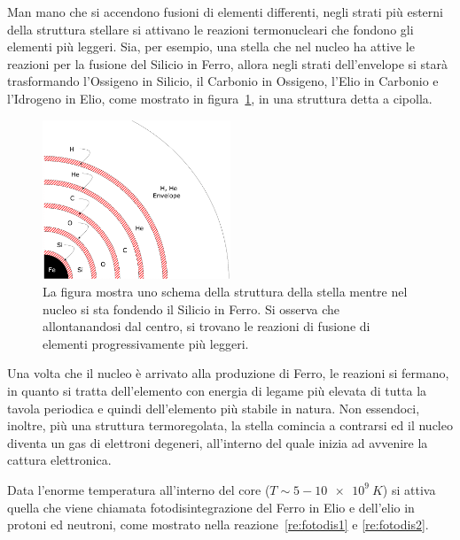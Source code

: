 Man mano che si accendono fusioni di elementi differenti, negli strati più esterni della struttura stellare si attivano le reazioni termonucleari che fondono gli elementi più leggeri. Sia, per esempio, una stella che nel nucleo ha attive le reazioni per la fusione del Silicio in Ferro, allora negli strati dell'envelope si starà trasformando l'Ossigeno in Silicio, il Carbonio in Ossigeno, l'Elio in Carbonio e l'Idrogeno in Elio, come mostrato in figura~\ref{fig:onion}, in una struttura detta a cipolla.

\begin{figure}
    \centering
    \includegraphics[width = 0.5\textwidth]{immagini/onion.png}
    \caption{La figura mostra uno schema della struttura della stella mentre nel nucleo si sta fondendo il Silicio in Ferro. Si osserva che allontanandosi dal centro, si trovano le reazioni di fusione di elementi progressivamente più leggeri.}\label{fig:onion}
\end{figure}

Una volta che il nucleo è arrivato alla produzione di Ferro, le reazioni si fermano, in quanto si tratta dell'elemento con energia di legame più elevata di tutta la tavola periodica e quindi dell'elemento più stabile in natura. Non essendoci, inoltre, più una struttura termoregolata, la stella comincia a contrarsi ed il nucleo diventa un gas di elettroni degeneri, all'interno del quale inizia ad avvenire la cattura elettronica. 


Data l'enorme temperatura all'interno del core ($T \sim 5-\SI{10e9}{K}$) si attiva quella che viene chiamata fotodisintegrazione del Ferro in Elio e dell'elio in protoni ed neutroni, come mostrato nella reazione~\ref{re:fotodis1} e  \ref{re:fotodis2}.


